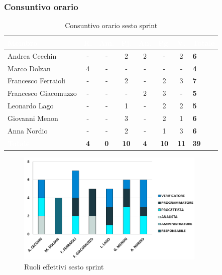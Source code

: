 \subsubsection{Consuntivo orario}
{
\setlength{\tabcolsep}{10pt}
\renewcommand{\arraystretch}{1.5}
\begin{table}[h!]
    \centering
    \begin{tabularx}{\textwidth}{| l | c | c | c | c | c | c | X |}
        \hline
        \rowcolor{headerrow} \textbf{\textcolor{white}{Membro}} & \textbf{\textcolor{white}{R.}} & \textbf{\textcolor{white}{Am.}} & \textbf{\textcolor{white}{Pj.}} & \textbf{\textcolor{white}{An.}} & \textbf{\textcolor{white}{Pg.}} & \textbf{\textcolor{white}{V.}} & \textbf{\textcolor{white}{Totale}} \\
        \hline
        Andrea Cecchin & - & -  & 2 & 2 & - & 2 & \textbf{6} \\
        \hline
        Marco Dolzan & 4 & - & - & - & - & - & \textbf{4} \\
        \hline
        Francesco Ferraioli & - & - & 2 & - & 2 & 3 & \textbf{7} \\
        \hline  
        Francesco Giacomuzzo & - & - & - & 2 & 3 & - & \textbf{5} \\
        \hline
        Leonardo Lago & - & - & 1 & - & 2 & 2 & \textbf{5} \\
        \hline
        Giovanni Menon & - & - & 3 & - & 2 & 1 & \textbf{6} \\
        \hline
        Anna Nordio & - & - & 2 & - & 1 & 3 & \textbf{6} \\
        \hline
    \cellcolor{headerrow} \textbf{\textcolor{white}{Totale}} & \textbf{4} & \textbf{0} & \textbf{10} & \textbf{4} & \textbf{10} & \textbf{11} & \textbf{39} \\
        \hline
    \end{tabularx} 
    \caption{Consuntivo orario sesto sprint}
    \label{tab:consuntivoorariosestosprint}
\end{table}
}

\begin{figure}[h!]
    \centering
    \includegraphics[width=0.8\textwidth]{cons6ruoli.png}
    \caption{Ruoli effettivi sesto sprint}
    \label{fig:consuntivoorariosestosprint}
\end{figure}

